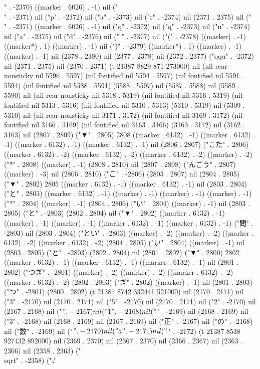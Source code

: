 " . -2370) ((marker . 6026) . -1) nil ("\\" . -2371) nil ("p" . -2372) nil ("a" . -2373) nil ("r" . -2374) nil (2371 . 2375) nil ("\\" . -2371) ((marker . 6026) . -1) nil ("q" . -2372) nil ("q" . -2373) nil ("u" . -2374) nil ("a" . -2375) nil ("d" . -2376) nil (" " . -2377) nil ("(" . -2378) ((marker) . -1) ((marker*) . 1) ((marker) . -1) nil (")" . -2379) ((marker*) . 1) ((marker) . -1) ((marker) . -1) nil (2378 . 2380) nil (2377 . 2378) nil (2372 . 2377) ("qqu" . -2372) nil (2371 . 2375) nil (2370 . 2371) (t 21387 8829 871 273000) nil (nil rear-nonsticky nil 5596 . 5597) (nil fontified nil 5594 . 5597) (nil fontified nil 5591 . 5594) (nil fontified nil 5588 . 5591) (5588 . 5597) nil (5587 . 5588) nil (5589 . 5590) nil (nil rear-nonsticky nil 5318 . 5319) (nil fontified nil 5316 . 5319) (nil fontified nil 5313 . 5316) (nil fontified nil 5310 . 5313) (5310 . 5319) nil (5309 . 5310) nil (nil rear-nonsticky nil 3171 . 3172) (nil fontified nil 3169 . 3172) (nil fontified nil 3166 . 3169) (nil fontified nil 3163 . 3166) (3163 . 3172) nil (3162 . 3163) nil (2807 . 2809) ("▼" . 2805) 2808 ((marker . 6132) . -1) ((marker . 6132) . -1) ((marker . 6132) . -1) ((marker . 6132) . -1) nil (2806 . 2807) ("こた" . 2806) ((marker . 6132) . -2) ((marker . 6132) . -2) ((marker . 6132) . -2) ((marker) . -2) ("*" . 2808) ((marker) . -1) (2808 . 2810) nil (2807 . 2808) ("んごう" . 2807) ((marker) . -3) nil (2806 . 2810) ("こ" . -2806) (2805 . 2807) nil (2804 . 2805) ("▼" . 2802) 2805 ((marker . 6132) . -1) ((marker . 6132) . -1) nil (2803 . 2804) ("と" . 2803) ((marker . 6132) . -1) ((marker) . -1) ((marker) . -1) ((marker) . -1) ("*" . 2804) ((marker) . -1) (2804 . 2806) ("い" . 2804) ((marker) . -1) nil (2803 . 2805) ("と" . -2803) (2802 . 2804) nil ("▼" . 2802) ((marker . 6132) . -1) ((marker) . -1) ((marker) . -1) ((marker . 6132) . -1) ((marker . 6132) . -1) ("問" . -2803) nil (2803 . 2804) ("とい" . -2803) ((marker) . -2) ((marker) . -2) ((marker . 6132) . -2) ((marker . 6132) . -2) (2804 . 2805) ("い" . 2804) ((marker) . -1) nil (2803 . 2805) ("と" . -2803) (2802 . 2804) nil (2801 . 2802) ("▼" . 2800) 2802 ((marker . 6132) . -1) ((marker . 6132) . -1) ((marker . 6132) . -1) nil (2801 . 2802) ("つぎ" . -2801) ((marker) . -2) ((marker) . -2) ((marker . 6132) . -2) ((marker . 6132) . -2) (2802 . 2803) ("ぎ" . 2802) ((marker) . -1) nil (2801 . 2803) ("つ" . -2801) (2800 . 2802) (t 21387 8742 332441 521000) nil (2170 . 2171) nil ("3" . -2170) nil (2170 . 2171) nil ("5" . -2170) nil (2170 . 2171) nil ("2" . -2170) nil (2167 . 2168) nil ("$" . -2167) nil ("1" . -2168) nil ("$" . -2169) nil (2168 . 2169) nil ("3" . -2168) nil (2168 . 2169) nil (2167 . 2169) nil ("正" . -2167) nil ("の" . -2168) nil ("数" . -2169) nil ("$" . -2170) nil ("a" . -2171) nil ("$" . -2172) (t 21387 8538 927432 892000) nil (2369 . 2370) nil (2367 . 2370) nil (2366 . 2367) nil (2363 . 2366) nil (2358 . 2363) ("\\sqrt" . -2358) ("√
